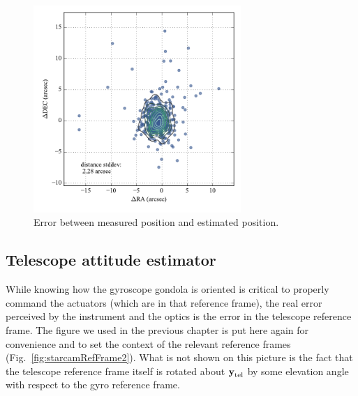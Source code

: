 \begin{figure}[!h]
\begin{center}
\includegraphics[width=0.7\textwidth]{Figures/measured_vs_estimated.pdf}
\caption[Error between measured position and estimated position]{Error between measured position and estimated position.}
\label{fig:MeasuredVsEstimated}
\end{center}
\end{figure}




\subsection{Telescope attitude estimator}

While knowing how the gyroscope gondola is oriented is critical to properly command the actuators (which are in that reference frame), the real error perceived by the instrument and the optics is the error in the telescope reference frame. The figure we used in the previous chapter is put here again for convenience and to set the context of the relevant reference frames (Fig.~\ref{fig:starcamRefFrame2}). What is not shown on this picture is the fact that the telescope reference frame itself is rotated about $\textrm{\textbf{y}}_{\textrm{tel}}$ by some elevation angle with respect to the gyro reference frame. 

